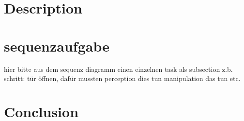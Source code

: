 \documentclass[main.tex]{subfiles}
\begin{document}
	\section{Description}
	
	\section{sequenzaufgabe}
	hier bitte aus dem sequenz diagramm einen einzelnen task als subsection z.b. schritt: tür öffnen, dafür mussten perception dies tun manipulation das tun etc.
	
	\section{Conclusion}
	
	
	\endgroup
	
\end{document}
